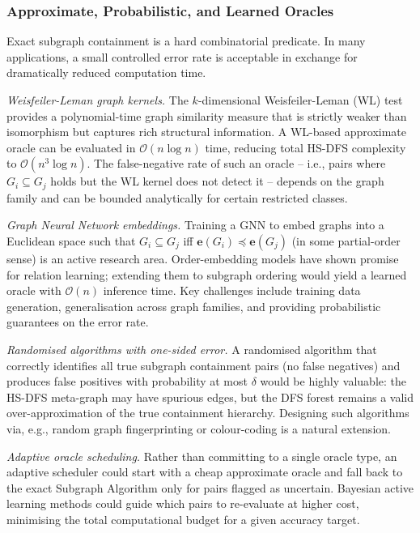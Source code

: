 ﻿\documentclass[12pt,a4paper]{article}
\theoremstyle{plain}
\theoremstyle{definition}
\theoremstyle{remark}
\begin{document}
	\subsubsection*{Approximate, Probabilistic, and Learned Oracles}

	Exact subgraph containment is a hard combinatorial predicate.  In many
	applications, a small controlled error rate is acceptable in exchange
	for dramatically reduced computation time.

	\emph{Weisfeiler-Leman graph kernels.}  The $k$-dimensional
	Weisfeiler-Leman (WL) test \cite{weisfeiler1968} provides a polynomial-time
	graph similarity measure that is strictly weaker than isomorphism but captures
	rich structural information.  A WL-based approximate oracle can be evaluated
	in $\mathcal{O}(n \log n)$ time, reducing total HS-DFS complexity to
	$\mathcal{O}(n^3 \log n)$.  The false-negative rate of such an oracle --
	i.e., pairs where $G_i \subseteq G_j$ holds but the WL kernel does not
	detect it -- depends on the graph family and can be bounded analytically for
	certain restricted classes.

	\emph{Graph Neural Network embeddings.}  Training a GNN to embed graphs
	into a Euclidean space such that $G_i \subseteq G_j$ iff
	$\mathbf{e}(G_i) \preceq \mathbf{e}(G_j)$ (in some partial-order sense) is
	an active research area.  Order-embedding models \cite{weisfeiler1968} have
	shown promise for relation learning; extending them to subgraph ordering
	would yield a learned oracle with $\mathcal{O}(n)$ inference time.
	Key challenges include training data generation, generalisation across
	graph families, and providing probabilistic guarantees on the error rate.

	\emph{Randomised algorithms with one-sided error.}  A randomised algorithm
	that correctly identifies all true subgraph containment pairs (no false
	negatives) and produces false positives with probability at most $\delta$
	would be highly valuable: the HS-DFS meta-graph may have spurious edges,
	but the DFS forest remains a valid over-approximation of the true
	containment hierarchy.  Designing such algorithms via, e.g., random
	graph fingerprinting or colour-coding \cite{cormen2009} is a natural
	extension.

	\emph{Adaptive oracle scheduling.}  Rather than committing to a single
	oracle type, an adaptive scheduler could start with a cheap approximate
	oracle and fall back to the exact Subgraph Algorithm only for pairs flagged
	as uncertain.  Bayesian active learning methods could guide which
	pairs to re-evaluate at higher cost, minimising the total computational
	budget for a given accuracy target.
\end{document}
